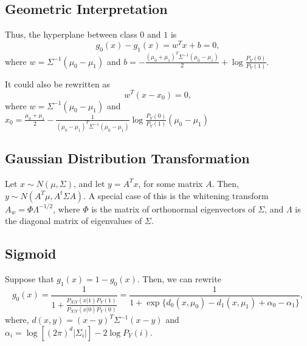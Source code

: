 \documentclass{article}
\newenvironment{topic}[1]{\subsection*{#1}}{}
\begin{document}
\begin{topic}{Geometric Interpretation}
    Thus, the hyperplane between class $0$ and $1$ is 
    \[
        g_0(x) - g_1(x) = w^Tx + b = 0,
    \]
    where $w = \Sigma^{-1}(\mu_0 - \mu_1)$ and $b = -\frac{(\mu_0 + \mu_1)^T\Sigma^{-1}(\mu_0 - \mu_1)}{2} + \log \frac{P_Y(0)}{P_Y(1)}$.

    It could also be rewritten as
    \[
        w^T(x - x_0) = 0,
    \]
    where $w = \Sigma^{-1}(\mu_0 - \mu_1)$ and $x_0 = \frac{\mu_0 + \mu_1}{2} - \frac{1}{(\mu_0 - \mu_1)^T\Sigma^{-1}(\mu_0 - \mu_1)} \log \frac{P_Y(0)}{P_Y(1)}(\mu_0 - \mu_1)$
\end{topic}

\begin{topic}{Gaussian Distribution Transformation}
    Let $x \sim N(\mu, \Sigma)$, and let $y = A^Tx$, for some matrix $A$. Then, $y \sim N(A^T\mu, A^t\Sigma A)$. A special case of this is the whitening transform $A_w = \Phi\Lambda^{-1/2}$, where $\Phi$ is the matrix of orthonormal eigenvectors of $\Sigma$, and $\Lambda$ is the diagonal matrix of eigenvalues of $\Sigma$.
\end{topic}

\begin{topic}{Sigmoid}
    Suppose that $g_1(x) = 1 - g_0(x)$. Then, we can rewrite
    \[
        g_0(x) = \frac{1}{1 + \frac{P_{X|Y}(x|1)P_Y(1)}{P_{X|Y}(x|0)P_Y(0)}} = \frac{1}{1 + \exp\{d_0(x, \mu_0) - d_1(x, \mu_1) + \alpha_0 - \alpha_1\}},
    \]
    where, $d(x, y) = (x - y)^T\Sigma^{-1}(x - y)$ and $\alpha_i = \log \left[(2\pi)^d|\Sigma_i|\right] - 2\log P_Y(i)$.
\end{topic}
\end{document}
